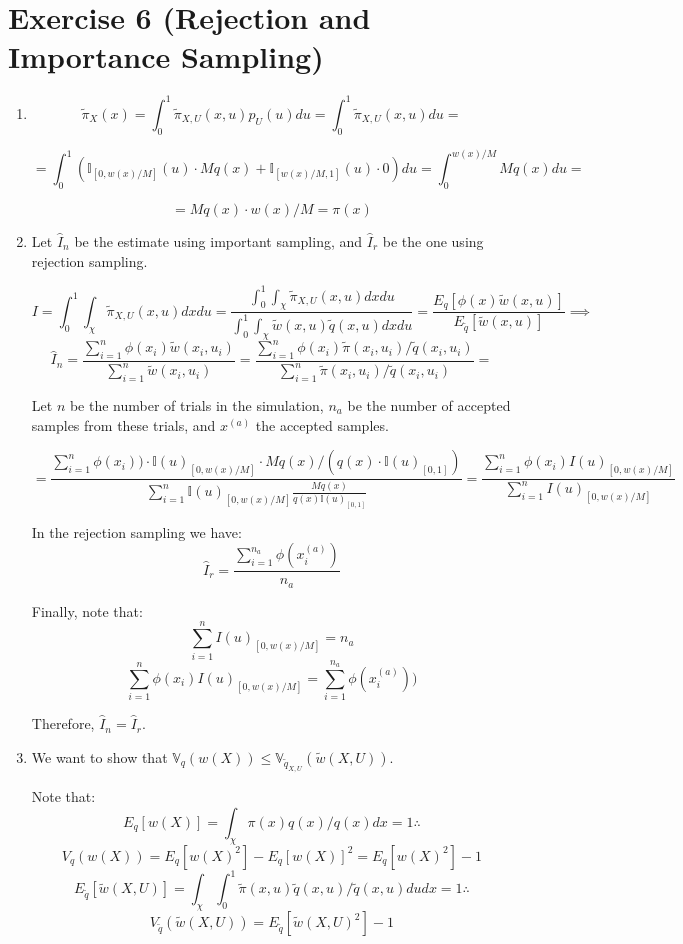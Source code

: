 \documentclass[12pt,letterpaper]{article}
\begin{document}
\section*{Exercise 6 (Rejection and Importance Sampling)}
\begin{enumerate}[leftmargin=!,labelindent=5pt]
	\item 
	$$\tilde{\pi}_X(x) =
	\int_0^1 \tilde\pi_{X,U}(x,u)p_U(u) du =
	\int_0^1 \tilde\pi_{X,U}(x,u) du = 
	$$

	$$=
	\int_0^1 \left(  
	\mathbb I_{[0,w(x)/M]}(u)\cdot Mq(x) + 
	\mathbb I_{[w(x)/M,1]}(u)\cdot 0 
	\right) du =
	\int_0^{w(x)/M} Mq(x)du  = 
	$$

	$$ = Mq(x)\cdot w(x)/M = \pi(x) $$

	\item Let $\hat I_n$ be the estimate using important sampling,
	and $ \hat I_r$ be the one using rejection sampling.

	$$ I = \int_0^1 \int_\chi \tilde\pi_{X,U}(x,u)dx du
	= \frac{\int_0^1 \int_\chi \tilde\pi_{X,U}(x,u)dx du}
	{\int_0^1 \int_\chi \tilde w(x,u) \tilde q(x,u)dx du} = 
	\frac{E_q[\phi(x)\tilde w(x,u)]}{E_{\tilde q}[\tilde w(x,u)]}
	\implies
	$$
	$$\hat I_n =
	\frac{\sum_{i=1}^{n} \phi(x_i)\tilde w(x_i,u_i)}
	{\sum_{i=1}^{n} \tilde w(x_i,u_i)} = 
	\frac{\sum_{i=1}^{n} \phi(x_i)\tilde \pi(x_i,u_i)/\tilde q(x_i,u_i)}
	{\sum_{i=1}^{n} \tilde \pi(x_i,u_i)/\tilde q(x_i,u_i)}=
	$$


	Let $n$ be the number of trials in the simulation, $n_a$
	be the number of accepted samples from these trials, and
	$x^{(a)}$ the accepted samples.

	$$ = 
	\frac{\sum_{i=1}^{n} \phi(x_i))\cdot
	\mathbb I(u)_{[0,w(x)/M]} \cdot Mq(x)/(q(x)\cdot \mathbb I(u)_{[0,1]})}
	{\sum_{i=1}^{n}\mathbb I(u)_{[0,w(x)/M]}\frac{Mq(x)}{q(x)
	\mathbb I(u)_{[0,1]}}} = 
	\frac{\sum_{i=1}^{n} \phi(x_i)I(u)_{[0,w(x)/M]}}
	{\sum_{i=1}^{n}I(u)_{[0,w(x)/M]}}
	$$

	In the rejection sampling we have:
	$$ \hat I_r = \frac{\sum_{i=1}^{n_a}\phi(x^{(a)}_i)}{n_a}$$

	Finally, note that:
	$$\sum_{i=1}^{n}I(u)_{[0,w(x)/M]} = n_a$$
	$$\sum_{i=1}^{n} \phi(x_i)I(u)_{[0,w(x)/M]} =
	\sum_{i=1}^{n_a}\phi(x^{(a)}_i))$$

	Therefore, $\hat I_n = \hat I_r$.

	\item We want to show that
	$\mathbb V_q(w(X)) \leq \mathbb V_{\tilde q_{X,U}}(\tilde w(X,U))$.

	Note that:
	$$E_q[w(X)] = \int_\chi \pi(x)q(x)/q(x)dx = 1 \therefore$$
	$$ V_q(w(X)) = E_q[w(X)^2] - E_q[w(X)]^2 =E_q[w(X)^2] - 1$$
	$$E_{\tilde q}[\tilde w(X,U)] =
	\int_\chi \int_0^1 \tilde \pi(x,u)\tilde q(x,u)/\tilde q(x,u)dudx
	= 1 \therefore$$
	$$ V_{\tilde q}(\tilde w(X,U)) =
	E_{\tilde q}[\tilde w(X,U)^2] - 1$$


\end{enumerate}
\end{document}
